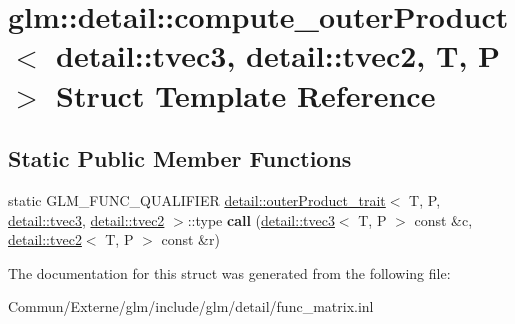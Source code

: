 \hypertarget{structglm_1_1detail_1_1compute__outer_product_3_01detail_1_1tvec3_00_01detail_1_1tvec2_00_01_t_00_01_p_01_4}{}\section{glm\+:\+:detail\+:\+:compute\+\_\+outer\+Product$<$ detail\+:\+:tvec3, detail\+:\+:tvec2, T, P $>$ Struct Template Reference}
\label{structglm_1_1detail_1_1compute__outer_product_3_01detail_1_1tvec3_00_01detail_1_1tvec2_00_01_t_00_01_p_01_4}
\subsection*{Static Public Member Functions}
\begin{DoxyCompactItemize}
\item 
static G\+L\+M\+\_\+\+F\+U\+N\+C\+\_\+\+Q\+U\+A\+L\+I\+F\+I\+ER \hyperlink{structglm_1_1detail_1_1outer_product__trait}{detail\+::outer\+Product\+\_\+trait}$<$ T, P, \hyperlink{structglm_1_1detail_1_1tvec3}{detail\+::tvec3}, \hyperlink{structglm_1_1detail_1_1tvec2}{detail\+::tvec2} $>$\+::type {\bfseries call} (\hyperlink{structglm_1_1detail_1_1tvec3}{detail\+::tvec3}$<$ T, P $>$ const \&c, \hyperlink{structglm_1_1detail_1_1tvec2}{detail\+::tvec2}$<$ T, P $>$ const \&r)\hypertarget{structglm_1_1detail_1_1compute__outer_product_3_01detail_1_1tvec3_00_01detail_1_1tvec2_00_01_t_00_01_p_01_4_a96862a6cc9a974bd7dcc4068f433ccf5}{}\label{structglm_1_1detail_1_1compute__outer_product_3_01detail_1_1tvec3_00_01detail_1_1tvec2_00_01_t_00_01_p_01_4_a96862a6cc9a974bd7dcc4068f433ccf5}

\end{DoxyCompactItemize}


The documentation for this struct was generated from the following file\+:\begin{DoxyCompactItemize}
\item 
Commun/\+Externe/glm/include/glm/detail/func\+\_\+matrix.\+inl\end{DoxyCompactItemize}
